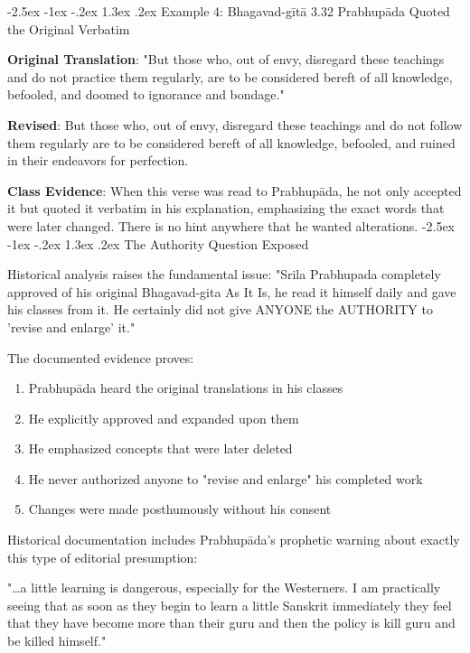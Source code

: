 \documentclass[12pt,twoside]{book}
\makeatletter
\renewcommand\section{\@startsection{section}{1}{\z@}%
{-2.5ex \@plus -1ex \@minus -.2ex}%
{1.3ex \@plus.2ex}%
{\normalfont\Large\bfseries}}
\makeatother
\begin{document}
\vspace{-0.3cm}
\section{Example 4: Bhagavad-gītā 3.32}
\label{sec:orgfe8d9fe}
Prabhupāda Quoted the Original Verbatim

\textbf{\textbf{Original Translation}}: "But those who, out of envy, disregard these teachings and do not practice them regularly, are to be considered bereft of all knowledge, befooled, and doomed to ignorance and bondage."

\textbf{\textbf{Revised}}: But those who, out of envy, disregard these teachings and do not follow them regularly are to be considered bereft of all knowledge, befooled, and ruined in their endeavors for perfection.

\textbf{\textbf{Class Evidence}}: When this verse was read to Prabhupāda, he not only accepted it but quoted it verbatim in his explanation, emphasizing the exact words that were later changed. There is no hint anywhere that he wanted alterations.
\section{The Authority Question Exposed}
\label{sec:orgb8996f2}

Historical analysis raises the fundamental issue: "Srila Prabhupada completely approved of his original Bhagavad-gita As It Is, he read it himself daily and gave his classes from it. He certainly did not give ANYONE the AUTHORITY to 'revise and enlarge' it."

The documented evidence proves:
\begin{enumerate}
\item Prabhupāda heard the original translations in his classes
\item He explicitly approved and expanded upon them
\item He emphasized concepts that were later deleted
\item He never authorized anyone to "revise and enlarge" his completed work
\item Changes were made posthumously without his consent
\end{enumerate}


Historical documentation includes Prabhupāda's prophetic warning about exactly this type of editorial presumption:

"\ldots{}a little learning is dangerous, especially for the Westerners. I am practically seeing that as soon as they begin to learn a little Sanskrit immediately they feel that they have become more than their guru and then the policy is kill guru and be killed himself."
\end{document}
